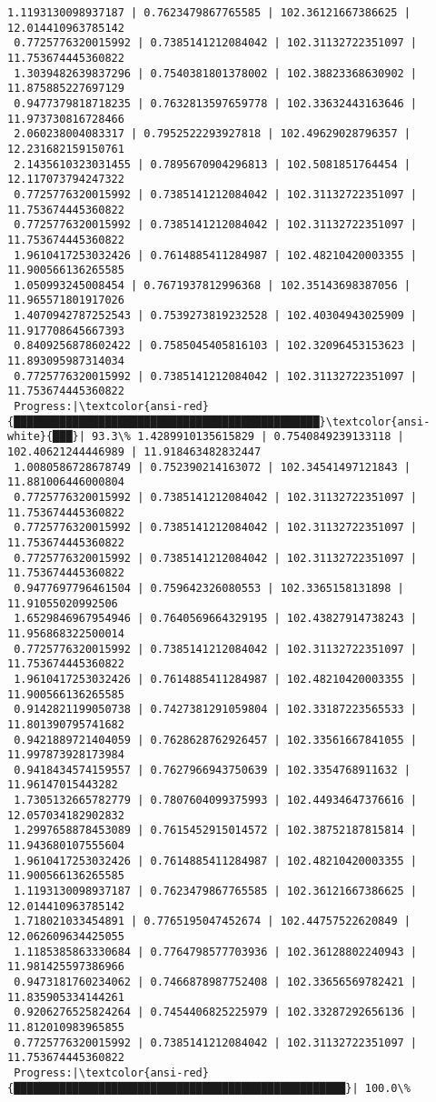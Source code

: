 \documentclass[11pt]{article}
\begin{document}
\begin{Verbatim}[commandchars=\\\{\}]
 1.1193130098937187 | 0.7623479867765585 | 102.36121667386625 | 12.014410963785142
 0.7725776320015992 | 0.7385141212084042 | 102.31132722351097 | 11.753674445360822
 1.3039482639837296 | 0.7540381801378002 | 102.38823368630902 | 11.875885227697129
 0.9477379818718235 | 0.7632813597659778 | 102.33632443163646 | 11.973730816728466
 2.060238004083317 | 0.7952522293927818 | 102.49629028796357 | 12.231682159150761
 2.1435610323031455 | 0.7895670904296813 | 102.5081851764454 | 12.117073794247322
 0.7725776320015992 | 0.7385141212084042 | 102.31132722351097 | 11.753674445360822
 0.7725776320015992 | 0.7385141212084042 | 102.31132722351097 | 11.753674445360822
 1.9610417253032426 | 0.7614885411284987 | 102.48210420003355 | 11.900566136265585
 1.050993245008454 | 0.7671937812996368 | 102.35143698387056 | 11.965571801917026
 1.4070942787252543 | 0.7539273819232528 | 102.40304943025909 | 11.917708645667393
 0.8409256878602422 | 0.7585045405816103 | 102.32096453153623 | 11.893095987314034
 0.7725776320015992 | 0.7385141212084042 | 102.31132722351097 | 11.753674445360822
 Progress:|\textcolor{ansi-red}{███████████████████████████████████████████████}\textcolor{ansi-white}{███}| 93.3\% 1.4289910135615829 | 0.7540849239133118 | 102.40621244446989 | 11.918463482832447
 1.0080586728678749 | 0.752390214163072 | 102.34541497121843 | 11.881006446000804
 0.7725776320015992 | 0.7385141212084042 | 102.31132722351097 | 11.753674445360822
 0.7725776320015992 | 0.7385141212084042 | 102.31132722351097 | 11.753674445360822
 0.7725776320015992 | 0.7385141212084042 | 102.31132722351097 | 11.753674445360822
 0.9477697796461504 | 0.759642326080553 | 102.3365158131898 | 11.91055020992506
 1.6529846967954946 | 0.7640569664329195 | 102.43827914738243 | 11.956868322500014
 0.7725776320015992 | 0.7385141212084042 | 102.31132722351097 | 11.753674445360822
 1.9610417253032426 | 0.7614885411284987 | 102.48210420003355 | 11.900566136265585
 0.9142821199050738 | 0.7427381291059804 | 102.33187223565533 | 11.801390795741682
 0.9421889721404059 | 0.7628628762926457 | 102.33561667841055 | 11.997873928173984
 0.9418434574159557 | 0.7627966943750639 | 102.3354768911632 | 11.96147015443282
 1.7305132665782779 | 0.7807604099375993 | 102.44934647376616 | 12.057034182902832
 1.2997658878453089 | 0.7615452915014572 | 102.38752187815814 | 11.943680107555604
 1.9610417253032426 | 0.7614885411284987 | 102.48210420003355 | 11.900566136265585
 1.1193130098937187 | 0.7623479867765585 | 102.36121667386625 | 12.014410963785142
 1.718021033454891 | 0.7765195047452674 | 102.44757522620849 | 12.062609634425055
 1.1185385863330684 | 0.7764798577703936 | 102.36128802240943 | 11.981425597386966
 0.9473181760234062 | 0.7466878987752408 | 102.33656569782421 | 11.835905334144261
 0.9206276525824264 | 0.7454406825225979 | 102.33287292656136 | 11.812010983965855
 0.7725776320015992 | 0.7385141212084042 | 102.31132722351097 | 11.753674445360822
 Progress:|\textcolor{ansi-red}{███████████████████████████████████████████████████}| 100.0\%
    \end{Verbatim}
\end{document}
